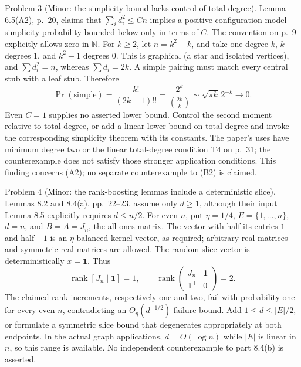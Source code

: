 \documentclass[10pt]{article}
\begin{document}
Problem 3 (Minor: the simplicity bound lacks control of total degree).  Lemma 6.5(A2), p. 20, claims that \(\sum_i d_i^2\le Cn\) implies a positive configuration-model simplicity probability bounded below only in terms of \(C\). The convention on p. 9 explicitly allows zero in \(\mathbb N\). For \(k\ge2\), let \(n=k^2+k\), and take one degree \(k\), \(k\) degrees \(1\), and \(k^2-1\) degrees \(0\). This is graphical (a star and isolated vertices), and \(\sum d_i^2=n\), whereas \(\sum d_i=2k\). A simple pairing must match every central stub with a leaf stub. Therefore \[\Pr(\text{simple})
 =\frac{k!}{(2k-1)!!}
 =\frac{2^k}{\binom{2k}{k}}
 \sim \sqrt{\pi k}\,2^{-k}\longrightarrow0.\] Even \(C=1\) supplies no asserted lower bound. Control the second moment relative to total degree, or add a linear lower bound on total degree and invoke the corresponding simplicity theorem with its constants. The paper’s uses have minimum degree two or the linear total-degree condition T4 on p. 31; the counterexample does not satisfy those stronger application conditions. This finding concerns (A2); no separate counterexample to (B2) is claimed.\par
Problem 4 (Minor: the rank-boosting lemmas include a deterministic slice).  Lemmas 8.2 and 8.4(a), pp. 22–23, assume only \(d\ge1\), although their input Lemma 8.5 explicitly requires \(d\le n/2\). For even \(n\), put \(\eta=1/4\), \(E=\{1,\ldots,n\}\), \(d=n\), and \(B=A=J_n\), the all-ones matrix. The vector with half its entries \(1\) and half \(-1\) is an \(\eta\)-balanced kernel vector, as required; arbitrary real matrices and symmetric real matrices are allowed. The random slice vector is deterministically \(x=\mathbf1\). Thus \[\operatorname{rank}[J_n\mid\mathbf1]=1,\qquad
 \operatorname{rank}\begin{pmatrix}J_n&\mathbf1\\
 \mathbf1^{\mathsf T}&0\end{pmatrix}=2.\] The claimed rank increments, respectively one and two, fail with probability one for every even \(n\), contradicting an \(O_\eta(d^{-1/2})\) failure bound. Add \(1\le d\le |E|/2\), or formulate a symmetric slice bound that degenerates appropriately at both endpoints. In the actual graph applications, \(d=O(\log n)\) while \(|E|\) is linear in \(n\), so this range is available. No independent counterexample to part 8.4(b) is asserted.\par
\end{document}
